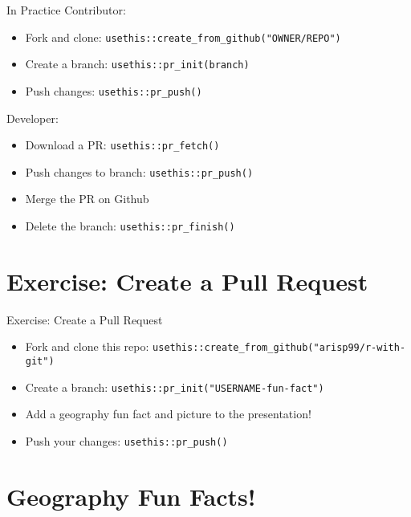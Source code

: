 \documentclass[
  ignorenonframetext,
]{beamer}
\providecommand{\tightlist}{%
  \setlength{\itemsep}{0pt}\setlength{\parskip}{0pt}}
\begin{document}
\begin{frame}[fragile]{In Practice}
\protect\hypertarget{in-practice}{}
Contributor:

\begin{itemize}
\tightlist
\item
  Fork and clone: \texttt{usethis::create\_from\_github("OWNER/REPO")}
\item
  Create a branch: \texttt{usethis::pr\_init(branch)}
\item
  Push changes: \texttt{usethis::pr\_push()}
\end{itemize}

Developer:

\begin{itemize}
\tightlist
\item
  Download a PR: \texttt{usethis::pr\_fetch()}
\item
  Push changes to branch: \texttt{usethis::pr\_push()}
\item
  Merge the PR on Github
\item
  Delete the branch: \texttt{usethis::pr\_finish()}
\end{itemize}
\end{frame}

\hypertarget{exercise-create-a-pull-request}{%
\section{Exercise: Create a Pull
Request}\label{exercise-create-a-pull-request}}

\begin{frame}[fragile]{Exercise: Create a Pull Request}
\begin{itemize}
\tightlist
\item
  Fork and clone this repo:
  \texttt{usethis::create\_from\_github("arisp99/r-with-git")}
\item
  Create a branch: \texttt{usethis::pr\_init("USERNAME-fun-fact")}
\item
  Add a geography fun fact and picture to the presentation!
\item
  Push your changes: \texttt{usethis::pr\_push()}
\end{itemize}
\end{frame}

\hypertarget{geography-fun-facts}{%
\section{Geography Fun Facts!}\label{geography-fun-facts}}
\end{document}
